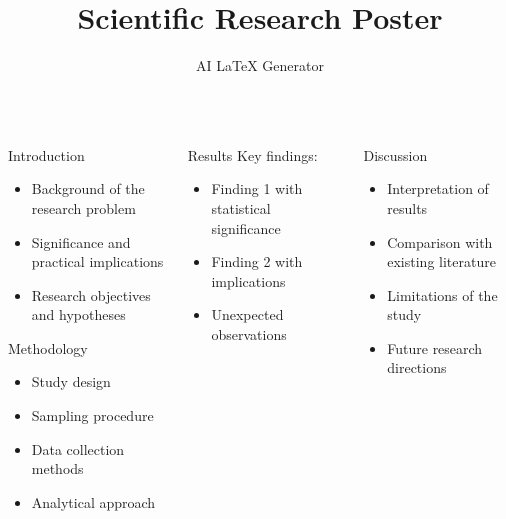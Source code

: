 \documentclass[final]{beamer}
\title{Scientific Research Poster}
\author{AI LaTeX Generator}
\institute{University Department}
\begin{document}
\begin{frame}{}
  \begin{columns}[t]
    \begin{column}{.32\linewidth}
      \begin{block}{Introduction}
        \begin{itemize}
          \item Background of the research problem
          \item Significance and practical implications
          \item Research objectives and hypotheses
        \end{itemize}
      \end{block}
      
      \begin{block}{Methodology}
        \begin{itemize}
          \item Study design
          \item Sampling procedure
          \item Data collection methods
          \item Analytical approach
        \end{itemize}
      \end{block}
    \end{column}
    
    \begin{column}{.32\linewidth}
      \begin{block}{Results}
        \centering
        Key findings:
        \begin{itemize}
          \item Finding 1 with statistical significance
          \item Finding 2 with implications
          \item Unexpected observations
        \end{itemize}
      \end{block}
    \end{column}
    
    \begin{column}{.32\linewidth}
      \begin{block}{Discussion}
        \begin{itemize}
          \item Interpretation of results
          \item Comparison with existing literature
          \item Limitations of the study
          \item Future research directions
        \end{itemize}
      \end{block}
      

\end{column}
\end{columns}
\end{frame}
\end{document}
